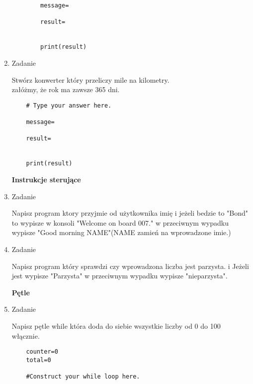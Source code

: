 \documentclass[11pt]{article}
\begin{document}
\begin{enumerate}
\begin{lstlisting}
		message=
		
		result=
		
		
		print(result)
	\end{lstlisting}

\item 
\begin{Large}
	Zadanie
\end{Large}
\par
Stwórz konwerter który przeliczy mile na kilometry.
\\ załóżmy, że rok ma zawsze 365 dni.
\begin{lstlisting}
	# Type your answer here.
	
	message=
	
	result=
	
	
	print(result)
\end{lstlisting}

\medskip
\begin{Large}
	\textbf{Instrukcje sterujące}
\end{Large}

\item 
\begin{Large}
	Zadanie
\end{Large}
\par
Napisz program ktory przyjmie od użytkownika imię i jeżeli bedzie to "Bond" to wypisze w konsoli "Welcome on board 007."  w przeciwnym wypadku wypisze "Good morning NAME"(NAME zamień na wprowadzone imie.)

\item 
\begin{Large}
	Zadanie
\end{Large}
\par
Napisz program który sprawdzi czy wprowadzona liczba jest parzysta. i Jeżeli jest wypisze "Parzysta" w przeciwnym wypadku wypisze "nieparzysta".

\medskip
\begin{Large}
	\textbf{Pętle}
\end{Large}

\item 
\begin{Large}
	Zadanie
\end{Large}
\par
Napisz pętle while która doda do siebie wszystkie liczby od 0 do 100 włącznie.
\begin{lstlisting}
	counter=0
	total=0
	
	#Construct your while loop here.
	
	
	

\end{lstlisting}
\end{enumerate}
\end{document}
